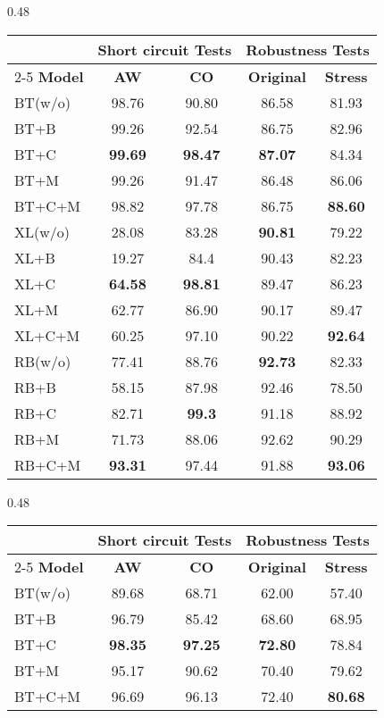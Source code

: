 \begin{table*}[th!]
\small
\centering
\begin{subtable}[t]{0.48\textwidth}
\centering
\begin{tabular}{l|cc|cc}\toprule
	& \multicolumn{2}{c|}{\bf Short circuit Tests} & \multicolumn{2}{c}{\bf Robustness Tests} \\ \cline{2-5}
\textbf{Model} &\textbf{AW} &\textbf{CO} & \textbf{Original} &\textbf{Stress}\\ \hline
\rowcolor{Gray}
BT(w/o)&98.76&90.80&86.58&81.93\\
BT+B&99.26&92.54&86.75&82.96\\
BT+C&\textbf{99.69}&\textbf{98.47}&\textbf{87.07}&84.34\\
BT+M&99.26&91.47&86.48&86.06\\
BT+C+M&98.82&97.78&86.75&\textbf{88.60}\\
\midrule

\rowcolor{Gray}
XL(w/o)&28.08&83.28&\textbf{90.81}&79.22\\
XL+B&19.27&84.4&90.43&82.23\\
XL+C&\textbf{64.58}&\textbf{98.81}&89.47&86.23\\
XL+M&62.77&86.90&90.17&89.47\\
XL+C+M&60.25&97.10&90.22&\textbf{92.64}\\
 \midrule
\rowcolor{Gray}
RB(w/o)&77.41&88.76&\textbf{92.73}&82.33\\
RB+B&58.15&87.98&92.46&78.50\\
RB+C&82.71&\textbf{99.3}&91.18&88.92\\
RB+M&71.73&88.06&92.62&90.29\\
RB+C+M&\textbf{93.31}&97.44&91.88&\textbf{93.06}\\
\bottomrule
\end{tabular}
\caption{ROC}
\end{subtable} 
\hfill
\begin{subtable}[t]{0.48\textwidth}
\centering
\begin{tabular}{l|cc|cc}\toprule
	& \multicolumn{2}{c|}{\bf Short circuit Tests} & \multicolumn{2}{c}{\bf Robustness Tests} \\ \cline{2-5}
\textbf{Model} &\textbf{AW} &\textbf{CO} & \textbf{Original} &\textbf{Stress}\\ \hline
\rowcolor{Gray}
BT(w/o)&89.68&68.71&62.00&57.40\\
BT+B&96.79&85.42&68.60&68.95\\
BT+C&\textbf{98.35}&\textbf{97.25}&\textbf{72.80}&78.84\\
BT+M&95.17&90.62&70.40&79.62\\
BT+C+M&96.69&96.13&72.40&\textbf{80.68}\\
\midrule
                     

\end{tabular}
\end{subtable}
\end{table*}
